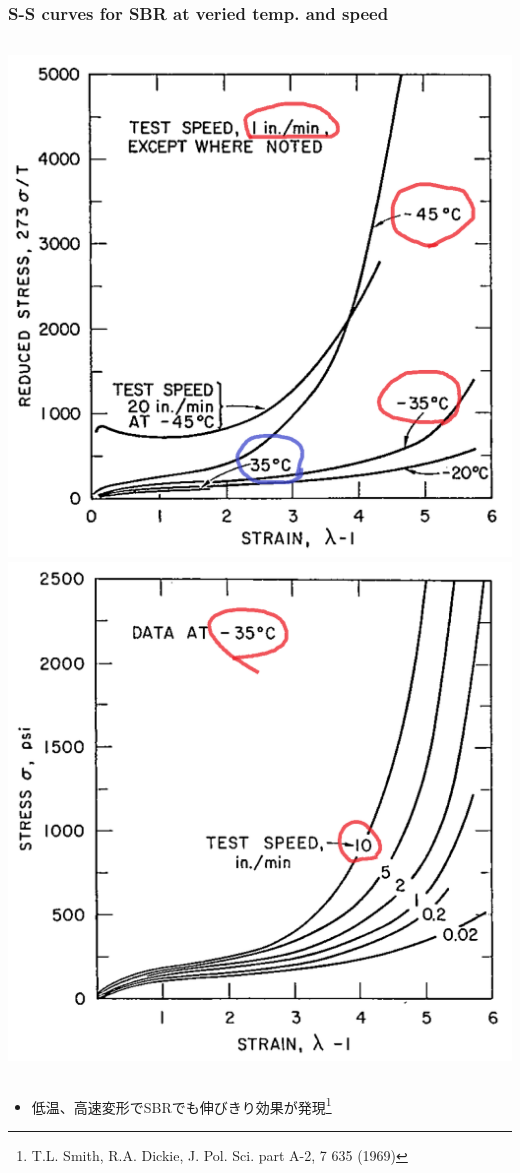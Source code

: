 \documentclass[aspectratio=169,11pt, dvipdfmx]{beamer}
\begin{document}
\begin{frame}
	\frametitle{S-S curves for SBR at veried temp. and speed}

			\begin{columns}[T, onlytextwidth]
				\centering
				\includegraphics[width=.65\textwidth]{SBR_lowTemp.png}
				\centering
				\includegraphics[width=.65\textwidth]{SBR_lowTemp_2.png}
			\end{columns}

            \vspace{2mm}

			\begin{itemize}
				\item \alert{低温、高速変形}でSBRでも伸びきり効果が発現\footnote{
					{\footnotesize T.L. Smith, R.A. Dickie, J. Pol. Sci. part A-2, 7 635 (1969)}
				}
			\end{itemize}

\end{frame}
\end{document}

